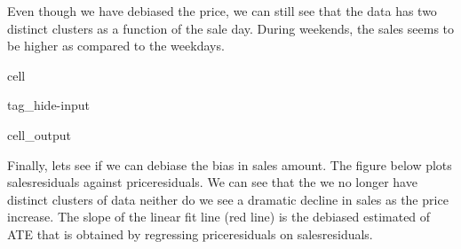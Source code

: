 \documentclass[letterpaper,10pt,english]{jupyterBook}
\begin{document}
\sphinxAtStartPar
Even though we have debiased the price, we can still see that the data has two distinct clusters as a function of the sale day. During weekends, the sales seems to be higher as compared to the weekdays.

\begin{sphinxuseclass}{cell}
\begin{sphinxuseclass}{tag_hide-input}\begin{sphinxVerbatimOutput}

\begin{sphinxuseclass}{cell_output}
\noindent{}

\end{sphinxuseclass}\end{sphinxVerbatimOutput}

\end{sphinxuseclass}
\end{sphinxuseclass}
\sphinxAtStartPar
Finally, lets see if we can debiase the bias in sales amount. The figure below plots sales\sphinxhyphen{}residuals against price\sphinxhyphen{}residuals. We can see that the we no longer have distinct clusters of data neither do we see a dramatic decline in sales as the price increase. The slope of the linear fit line (red line) is the debiased estimated of ATE that is obtained by regressing price\sphinxhyphen{}residuals on sales\sphinxhyphen{}residuals.
\end{document}
